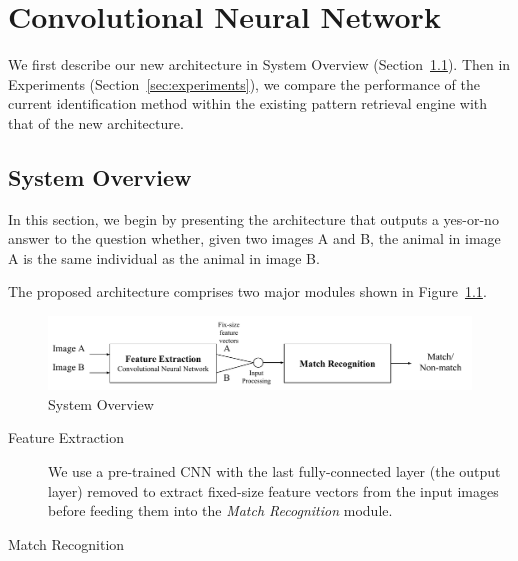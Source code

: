 \graphicspath{{./images/chap7/}}
\chapter{Convolutional Neural Network} %
\label{cha:convolutional_neural_network}

We first describe our new architecture in System Overview
(Section~\ref{sec:system_overview}). Then in Experiments
(Section~\ref{sec:experiments}), we compare the performance of the current
identification method within the existing pattern retrieval engine with that of
the new architecture.

\section{System Overview} %
\label{sec:system_overview}

In this section, we begin by presenting the architecture that outputs a
yes-or-no answer to the question whether, given two images A and B, the animal
in image A is the same individual as the animal in image B.

The proposed architecture comprises two major modules shown in
Figure~\ref{fig:cnn_overview}.

\begin{figure}[htb]
  \centering
  \includegraphics[width=\textwidth]{system/overview}
  \caption{System Overview}
  \label{fig:cnn_overview} %
\end{figure}

\begin{description}
    \item[Feature Extraction] We use a pre-trained CNN with the last
        fully-connected layer (the output layer) removed to extract fixed-size feature
  vectors from the input images before feeding them into the \emph{Match
  Recognition} module.
  \item[Match Recognition]
\end{description}

